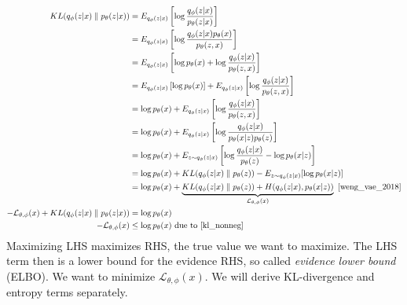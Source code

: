\documentclass{book}
\numberwithin{equation}{subsection}
\begin{document}
\begin{align}
KL(q_\phi(z|x) \parallel p_\theta(z|x))
&=E_{q_\phi(z|x)}\left[ \log\frac{q_\phi(z|x)}{p_\theta(z|x)}\right]\\
&=E_{q_\phi(z|x)}\left[ \log\frac{q_\phi(z|x)p_\theta(x)}{p_\theta(z,x)}\right]\\
&=E_{q_\phi(z|x)}\left[ \log p_\theta(x) + \log\frac{q_\phi(z|x)}{p_\theta(z,x)}\right]\\
&=E_{q_\phi(z|x)}\left[\log p_\theta(x)\right] + E_{q_\phi(z|x)}\left[\log\frac{q_\phi(z|x)}{p_\theta(z,x)}\right]\\
&=\log p_\theta(x) + E_{q_\phi(z|x)}\left[\log\frac{q_\phi(z|x)}{p_\theta(z,x)}\right]\\
&=\log p_\theta(x) + E_{q_\phi(z|x)}\left[\log\frac{q_\phi(z|x)}{p_\theta(x|z)p_\theta(z)}\right]\\
&=\log p_\theta(x) + E_{z\sim q_\phi(z|x)}\left[\log \frac{q_\phi(z|x)}{p_\theta(z)} - \log p_\theta(x| z)\right]\\
&=\log p_\theta(x) + KL(q_\phi(z|x) \parallel p_\theta(z)) - E_{z\sim q_\phi(z|x)}[\log p_\theta(x|z)]\\
&=\log p_\theta(x) + \underbrace{KL(q_\phi(z|x) \parallel p_\theta(z)) + H(q_\phi(z|x), p_\theta(x|z))}_{\mathcal{L}_{\theta, \phi}(x)}~\cite{weng_vae_2018}\\
-\mathcal{L}_{\theta, \phi}(x)+KL(q_\phi(z|x) \parallel p_\theta(z|x)) &= \log p_\theta(x)\\
-\mathcal{L}_{\theta, \phi}(x) &\leq \log p_\theta(x)\ \text{due to~\ref{kl_nonneg}} \label{vae_elbo}
\end{align}
Maximizing LHS maximizes RHS, the true value we want to maximize. The LHS term then is a lower bound for the evidence RHS, so called \textit{evidence lower bound} (ELBO). We want to minimize $\mathcal{L}_{\theta, \phi}(x)$. We will derive KL-divergence and entropy terms separately.
\end{document}
